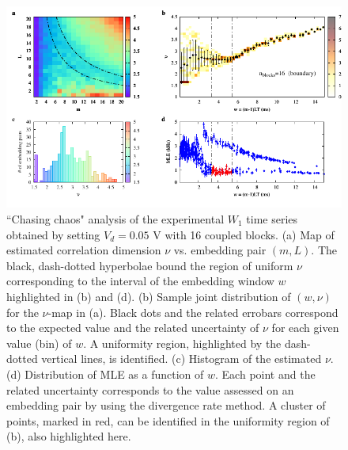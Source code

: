 \begin{figure}[H]
    \centering
    \includegraphics[width=\linewidth]{../blocks/16_blocks/2e5_points/plots/chaos_low.pdf}
    \caption{``Chasing chaos" analysis of the experimental $W_1$ time series obtained by setting $V_d=0.05$ V with 16 coupled blocks.
    (a) Map of estimated correlation dimension $\nu$ vs. embedding pair $(m, L)$.
    The black, dash-dotted hyperbolae bound the region of uniform $\nu$ corresponding to the interval of the
    embedding window $w$ highlighted in (b) and (d).
    (b) Sample joint distribution of $(w,\nu)$ for the $\nu$-map in (a).
    Black dots and the related errobars correspond to the expected value and the related uncertainty of $\nu$
    for each given value (bin) of $w$. A uniformity region, highlighted by the dash-dotted vertical lines,
    is identified. (c) Histogram of the estimated $\nu$. (d) Distribution of MLE as a function of $w$. Each point and the related
    uncertainty corresponds to the value assessed on an embedding pair by using the divergence rate method.
    A cluster of points, marked in red, can be identified in the uniformity region of (b), also highlighted here.}
    \label{fig:16 blocks chaos}
\end{figure}


